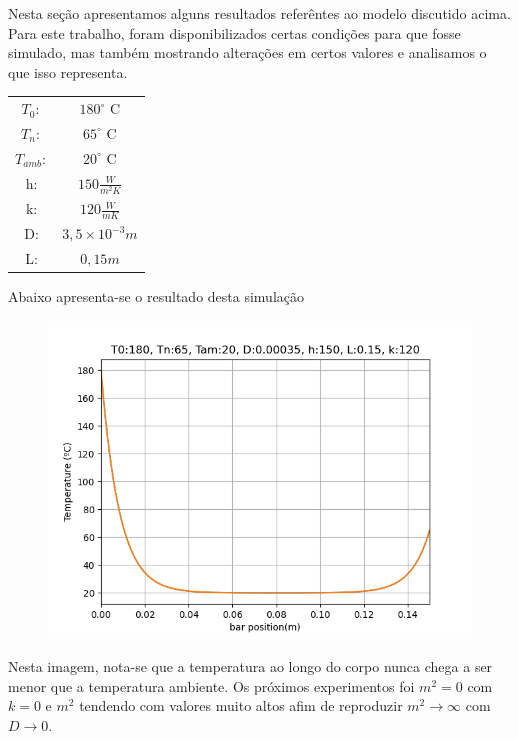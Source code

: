 \documentclass[a4paper, 12pt]{article}
\begin{document}
Nesta seção apresentamos alguns resultados referêntes ao modelo discutido acima. 
Para este trabalho, foram disponibilizados certas condições para que fosse simulado, mas também mostrando alterações em certos valores e analisamos o que isso representa.
\begin{table}[ht!]
\centering
\begin{tabular}{cc}
  $T_0:$ & $180^\circ$ C \\
  $T_n:$ & $65^\circ$ C  \\
  $T_{amb}:$ & $20^\circ$ C  \\
   h: & $150\frac{W}{m^2K}$ \\
   k: & $120\frac{W}{mK}$ \\
   D: & $3,5 \times 10^{-3}m$ \\
   L: & $0,15m$ \\
\end{tabular}
\end{table}
Abaixo apresenta-se o resultado desta simulação
\begin{figure}[ht!]
\centering
\includegraphics[scale=0.5]{figs/fst.png}
\end{figure}
Nesta imagem, nota-se que a temperatura ao longo do corpo nunca chega a ser menor que a temperatura ambiente.\newline
Os próximos experimentos foi $m^2 = 0$ com $k=0$ e $m^2$ tendendo com valores muito altos afim de reproduzir $m^2 \to \infty$ com $D \to 0$. 
\end{document}
